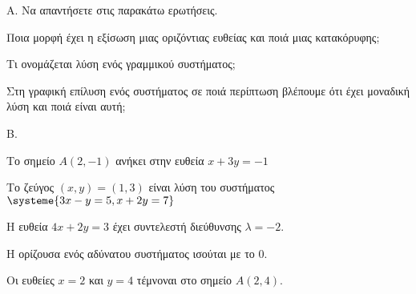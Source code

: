 Α. Να απαντήσετε στις παρακάτω ερωτήσεις.
\begin{rlist}
\item Ποια μορφή έχει η εξίσωση μιας οριζόντιας ευθείας και ποιά μιας κατακόρυφης;
\item Τι ονομάζεται λύση ενός γραμμικού συστήματος;
\item Στη γραφική επίλυση ενός συστήματος σε ποιά περίπτωση βλέπουμε ότι έχει μοναδική λύση και ποιά είναι αυτή;
\end{rlist}
Β. \swstolathos
\begin{rlist}
\item Το σημείο $ A(2,-1) $ ανήκει στην ευθεία $ x+3y=-1 $
\item Το ζεύγος $ (x,y)=(1,3) $ είναι λύση του συστήματος $ \systeme{3x-y=5,x+2y=7} $
\item Η ευθεία $ 4x+2y=3 $ έχει συντελεστή διεύθυνσης $ \lambda=-2 $.
\item Η ορίζουσα ενός αδύνατου συστήματος ισούται με το $ 0 $.
\item Οι ευθείες $ x=2 $ και $ y=4 $ τέμνοναι στο σημείο $ A(2,4) $.
\end{rlist}